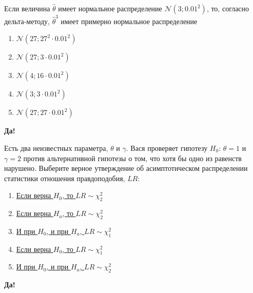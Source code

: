 \documentclass[t]{beamer}
\newcommand{\cN}{\mathcal{N}}
\begin{document}
 \begin{frame} \label{19-Yes} 
\begin{block}{19} 

    Если величина $\hat\theta$ имеет нормальное распределение $\cN(3;0.01^2)$, то, согласно дельта-методу, $\hat\theta^3$ имеет примерно нормальное распределение
    

 \end{block} 
\begin{enumerate} 
\item[] \hyperlink{19-Yes}{\beamergotobutton{} $\cN(27;27^2\cdot 0.01^2)$}
\item[] \hyperlink{19-No}{\beamergotobutton{} $\cN(27;3\cdot 0.01^2)$}
\item[] \hyperlink{19-No}{\beamergotobutton{} $\cN(4;16\cdot 0.01^2)$}
\item[] \hyperlink{19-No}{\beamergotobutton{} $\cN(3;3\cdot 0.01^2)$}
\item[] \hyperlink{19-No}{\beamergotobutton{} $\cN(27;27\cdot 0.01^2)$}
\end{enumerate} 

 \textbf{Да!} 
 \hyperlink{20}{}\end{frame} 


 \begin{frame} \label{20-Yes} 
\begin{block}{20} 

    Есть два неизвестных параметра, $\theta$ и $\gamma$. Вася проверяет гипотезу $H_0$: $\theta = 1$ и $\gamma = 2$ против альтернативной гипотезы о том, что хотя бы одно из равенств нарушено. Выберите верное утверждение об асимптотическом распределении статистики отношения правдоподобия, $LR$:


 \end{block} 
\begin{enumerate} 
\item[] \hyperlink{20-Yes}{\beamergotobutton{} Если верна $H_0$, то $LR \sim \chi_2^2$}
\item[] \hyperlink{20-No}{\beamergotobutton{} Если верна $H_a$, то $LR \sim \chi_2^2$}
\item[] \hyperlink{20-No}{\beamergotobutton{} И при $H_0$, и при $H_a$, $LR \sim \chi_1^2$}
\item[] \hyperlink{20-No}{\beamergotobutton{} Если верна $H_0$, то $LR \sim \chi_1^2$}
\item[] \hyperlink{20-No}{\beamergotobutton{} И при $H_0$, и при $H_a$, $LR \sim \chi_2^2$}
\end{enumerate} 

 \textbf{Да!} 
 \hyperlink{21}{}\end{frame} 
\end{document}
